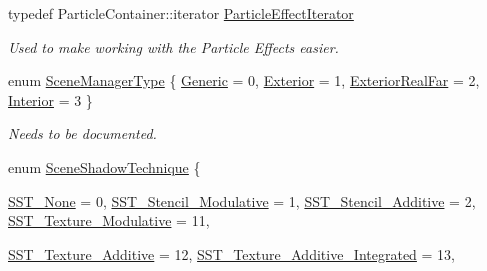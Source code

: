 \begin{DoxyCompactItemize}
\item 
\hypertarget{classMezzanine_1_1SceneManager_a5f3bd65fb09c7a08202083cc48e46fe7}{
typedef ParticleContainer::iterator \hyperlink{classMezzanine_1_1SceneManager_a5f3bd65fb09c7a08202083cc48e46fe7}{ParticleEffectIterator}}
\label{classMezzanine_1_1SceneManager_a5f3bd65fb09c7a08202083cc48e46fe7}

\begin{DoxyCompactList}\small\item\em Used to make working with the Particle Effects easier. \item\end{DoxyCompactList}\item 
enum \hyperlink{classMezzanine_1_1SceneManager_ad6e20c08b97a230314abda3e5826f274}{SceneManagerType} \{ \hyperlink{classMezzanine_1_1SceneManager_ad6e20c08b97a230314abda3e5826f274a6cd584c01715ad16c076728aea716607}{Generic} =  0, 
\hyperlink{classMezzanine_1_1SceneManager_ad6e20c08b97a230314abda3e5826f274a3cc51919e031a43bf4588dac5b693d0e}{Exterior} =  1, 
\hyperlink{classMezzanine_1_1SceneManager_ad6e20c08b97a230314abda3e5826f274a22b864e95238f8719579e4112b99e349}{ExteriorRealFar} =  2, 
\hyperlink{classMezzanine_1_1SceneManager_ad6e20c08b97a230314abda3e5826f274a1cd5d84d522f7a4692d8c524ace547fe}{Interior} =  3
 \}
\begin{DoxyCompactList}\small\item\em Needs to be documented. \item\end{DoxyCompactList}\item 
enum \hyperlink{classMezzanine_1_1SceneManager_a8149cd1ec188e0d57935d71c6a7134c6}{SceneShadowTechnique} \{ \par
\hyperlink{classMezzanine_1_1SceneManager_a8149cd1ec188e0d57935d71c6a7134c6aeedc28307131c43b9ae0bff12c8b1cda}{SST\_\-None} =  0, 
\hyperlink{classMezzanine_1_1SceneManager_a8149cd1ec188e0d57935d71c6a7134c6a616375ae458dbd612ff9745895d7e1f1}{SST\_\-Stencil\_\-Modulative} =  1, 
\hyperlink{classMezzanine_1_1SceneManager_a8149cd1ec188e0d57935d71c6a7134c6a216c1b4f5e8b891ae9e74abf48790ec8}{SST\_\-Stencil\_\-Additive} =  2, 
\hyperlink{classMezzanine_1_1SceneManager_a8149cd1ec188e0d57935d71c6a7134c6acfa2f5f4596184169e9a6495273fe6c7}{SST\_\-Texture\_\-Modulative} =  11, 
\par
\hyperlink{classMezzanine_1_1SceneManager_a8149cd1ec188e0d57935d71c6a7134c6a966cfba4dd29dd9248c6283ec37e3d8f}{SST\_\-Texture\_\-Additive} =  12, 
\hyperlink{classMezzanine_1_1SceneManager_a8149cd1ec188e0d57935d71c6a7134c6ae673066d535f340debfa4a6210d6b0ce}{SST\_\-Texture\_\-Additive\_\-Integrated} =  13, 

\end{DoxyCompactItemize}
